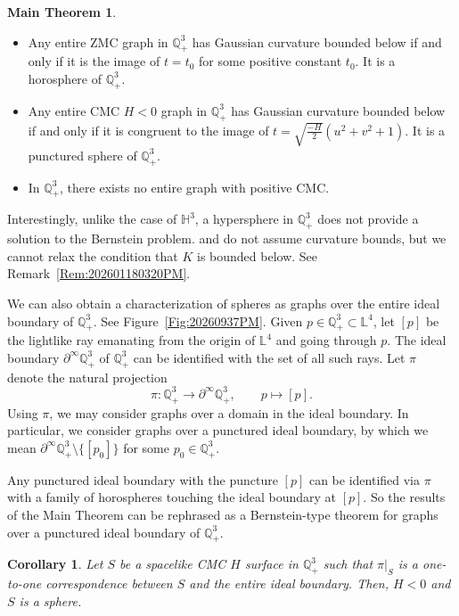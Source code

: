 \documentclass[12pt,reqno]{amsart}
\theoremstyle{plain} %
\newtheorem{corollary}[theorem]{Corollary}
\theoremstyle{definition}
\newtheorem*{maintheorem*}{Main Theorem}
\numberwithin{equation}{section}
\newcommand{\qthreep}{\mathbb{Q}^3_+}
\newcommand{\lfour}{\mathbb{L}^4}
\newcommand{\h}{H}%
\begin{document}
\begin{maintheorem*}\label{thm:Berntypeq3+}
	\begin{itemize}
		\item[(1)] Any entire ZMC graph in $\mathbb{Q}^3_+$ has Gaussian curvature bounded below
		      if and only if it is the image of $t=t_0$ for some positive constant $t_0$.
		      It is a horosphere of $\qthreep$.

		\item[(2)] Any entire CMC $ \h <0$  graph in $\mathbb{Q}^3_+$ has Gaussian curvature bounded below
		      if and only if it is congruent to the image of
		      $
			      t = \sqrt{\frac{-\h}{2} } (u^2 + v^2 + 1).
		      $
		      It is a punctured sphere of $\qthreep$.
		\item[(3)]  In $\mathbb{Q}^3_+$, there exists no entire graph with positive CMC.
	\end{itemize}
\end{maintheorem*}
Interestingly,  unlike the case of $\mathbb{H}^3$, a hypersphere in $\qthreep$ does not provide a solution to the Bernstein problem. \cite{doCL} and \cite{Koh} do not assume curvature bounds, but we cannot relax the condition that $K$ is bounded below. See Remark~\ref{Rem:202601180320PM}.

We can also obtain a characterization of spheres as graphs over the entire ideal boundary of $\qthreep$. See Figure~\ref{Fig:20260937PM}.
Given $p \in \qthreep \subset \lfour$, let $[p]$ be the lightlike ray emanating from the origin of $\lfour$ and going through $p$.
The ideal boundary $\partial^\infty\qthreep$ of $\qthreep$ can be identified with the set of all such rays.
Let $\pi$ denote the natural projection
$$
	\pi : \qthreep \to \partial^\infty\qthreep, \qquad
	p \mapsto [p].
$$
Using $\pi$, we may consider graphs over a domain in the ideal boundary.
In particular, we consider graphs over a punctured ideal boundary, by which we mean $\partial^\infty\qthreep\setminus\{[p_0]\}$ for some $p_0 \in \qthreep$.

Any punctured ideal boundary with the puncture $[p]$ can be identified via $\pi$ with a family of horospheres touching the ideal boundary at $[p]$. So the results of the Main Theorem can be rephrased as a Bernstein-type theorem for graphs over a punctured ideal boundary of $\qthreep$.

\begin{corollary}\label{Coro:202603071137AM}
	Let $S$ be a spacelike CMC $H$ surface in $\qthreep$ such that $\pi|_S$ is a one-to-one correspondence between $S$ and the entire ideal boundary. Then, $H<0$ and $S$ is a sphere.
\end{corollary}
\end{document}
